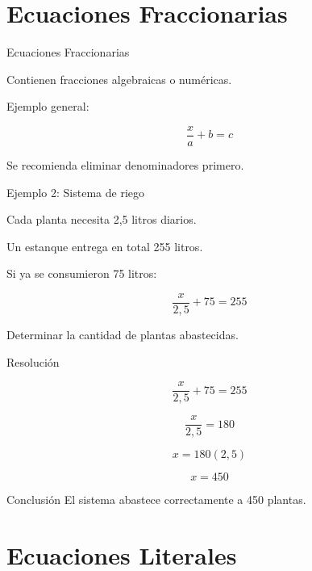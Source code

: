 \documentclass[handout,aspectratio=169]{beamer}
\begin{document}
	\section{Ecuaciones Fraccionarias}
	
	\begin{frame}{Ecuaciones Fraccionarias}
		
		Contienen fracciones algebraicas o numéricas.
		
		Ejemplo general:
		
		\[
		\frac{x}{a} + b = c
		\]
		
		Se recomienda eliminar denominadores primero.
		
	\end{frame}
	
	\begin{frame}{Ejemplo 2: Sistema de riego}
		
		Cada planta necesita 2,5 litros diarios.
		
		Un estanque entrega en total 255 litros.
		
		Si ya se consumieron 75 litros:
		
		\[
		\frac{x}{2,5} + 75 = 255
		\]
		
		Determinar la cantidad de plantas abastecidas.
		
	\end{frame}
	
	\begin{frame}{Resolución}
		
		\[
		\frac{x}{2,5} + 75 = 255
		\]
		
		\pause
		
		\[
		\frac{x}{2,5} = 180
		\]
		
		\pause
		
		\[
		x = 180(2,5)
		\]
		
		\pause
		
		\[
		x = 450
		\]
		
		\begin{block}{Conclusión}
			El sistema abastece correctamente a 450 plantas.
		\end{block}
		
	\end{frame}
	
	\section{Ecuaciones Literales}
	
\end{document}
